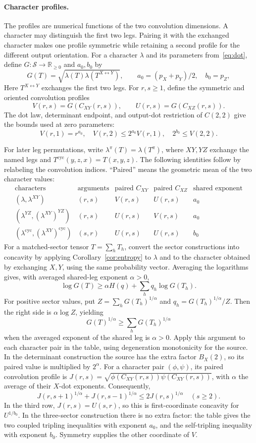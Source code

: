 \documentclass[11pt]{article}
\theoremstyle{remark}
\newcommand{\R}{\mathbb R}
\begin{document}
\paragraph{Character profiles.}
The profiles are numerical functions of the two convolution dimensions.
A character may distinguish the first two legs. Pairing it with the
exchanged character makes one profile symmetric while retaining a second
profile for the different output orientation.
For a character $\lambda$ and its parameters from~\eqref{eq:dot},
define $G:\mathcal S\to\R_{\geq0}$ and $a_0,b_0$ by
\[
 G(T)=\sqrt{\lambda(T)\lambda(T^{X\leftrightarrow Y})},\qquad
 a_0=(p_X+p_Y)/2,\quad b_0=p_Z,
\]
Here $T^{X\leftrightarrow Y}$ exchanges the first two legs. For $r,s\geq1$,
define the symmetric and oriented convolution profiles
\[
 V(r,s)=G(C_{XY}(r,s)),\qquad U(r,s)=G(C_{XZ}(r,s)).
\]
The dot law, determinant endpoint, and output-dot restriction of
$C(2,2)$ give the bounds used at zero parameters:
\[
 V(r,1)=r^{a_0},\quad V(r,2)\leq2^{a_0}V(r,1),\quad
 2^{b_0}\leq V(2,2).
\]

For later leg permutations, write $\lambda^\pi(T)=\lambda(T^\pi)$,
where $XY,YZ$ exchange the named legs and
$T^{\mathrm{cyc}}(y,z,x)=T(x,y,z)$. The following identities follow by
relabeling the convolution indices. ``Paired'' means the geometric mean
of the two character values:
\[
\begin{array}{c|c|c|c|c}
\text{characters}&\text{arguments}&\text{paired }C_{XY}&
\text{paired }C_{XZ}&\text{shared exponent}\\\hline
(\lambda,\lambda^{XY})&(r,s)&V(r,s)&U(r,s)&a_0\\
(\lambda^{YZ},(\lambda^{XY})^{YZ})&(r,s)&U(r,s)&V(r,s)&a_0\\
(\lambda^{\mathrm{cyc}},(\lambda^{XY})^{\mathrm{cyc}})&
(s,r)&U(r,s)&U(r,s)&b_0
\end{array}
\]
For a matched-sector tensor $T=\sum_hT_h$, convert the sector
constructions into concavity by applying
Corollary~\ref{cor:entropy} to $\lambda$ and to the character obtained
by exchanging $X,Y$, using the same probability vector. Averaging
the logarithms gives, with averaged shared-leg exponent $\alpha>0$,
\[
 \log G(T)\geq\alpha H(q)+\sum_h q_h\log G(T_h).
\]
For positive sector values, put
$Z=\sum_hG(T_h)^{1/\alpha}$ and $q_h=G(T_h)^{1/\alpha}/Z$.
Then the right side is $\alpha\log Z$, yielding
\[
 G(T)^{1/\alpha}\geq\sum_h G(T_h)^{1/\alpha}
\]
when the averaged exponent of the shared leg is $\alpha>0$.
Apply this argument to each character pair in the table, using
degeneration monotonicity for the source. In the
determinant construction the source has the extra factor $B_X(2)$,
so its paired value is multiplied by $2^\alpha$. For a character pair
$(\phi,\psi)$, its paired convolution profile is
$J(r,s)=\sqrt{\phi(C_{XY}(r,s))\psi(C_{XY}(r,s))}$, with $\alpha$
the average of their $X$-dot exponents. Consequently,
\[
 J(r,s+1)^{1/\alpha}+J(r,s-1)^{1/\alpha}
 \leq2J(r,s)^{1/\alpha}\quad(s\geq2).
\]
In the third row, $J(r,s)=U(s,r)$, so this is first-coordinate
concavity for $U^{1/b_0}$. In the
three-sector construction there is no extra factor: the table gives
the two coupled tripling inequalities with exponent $a_0$, and the
self-tripling inequality with exponent $b_0$. Symmetry supplies the
other coordinate of $V$.
\end{document}
